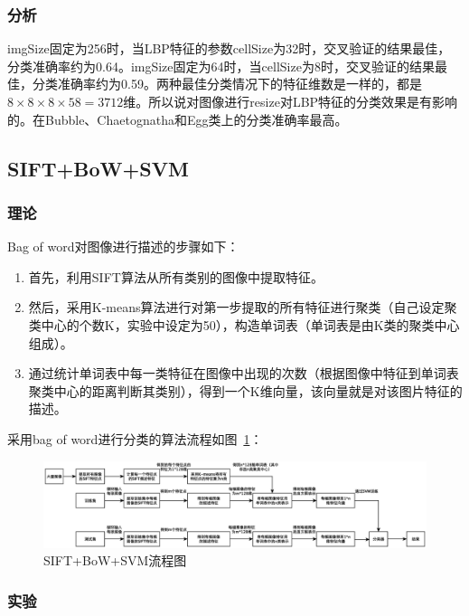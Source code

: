 \documentclass[12pt]{article}
\begin{document}
\subsubsection{分析}

imgSize固定为256时，当LBP特征的参数cellSize为32时，交叉验证的结果最佳，分类准确率约为0.64。imgSize固定为64时，当cellSize为8时，交叉验证的结果最佳，分类准确率约为0.59。两种最佳分类情况下的特征维数是一样的，都是$8\times 8 \times 8\times 58=3712$维。所以说对图像进行resize对LBP特征的分类效果是有影响的。在Bubble、Chaetognatha和Egg类上的分类准确率最高。

\subsection{SIFT+BoW+SVM}

\subsubsection{理论}
Bag of word对图像进行描述的步骤如下：
\begin{enumerate}
\item 首先，利用SIFT算法从所有类别的图像中提取特征。
\item 然后，采用K-means算法进行对第一步提取的所有特征进行聚类（自己设定聚类中心的个数K，实验中设定为50），构造单词表（单词表是由K类的聚类中心组成）。
\item 通过统计单词表中每一类特征在图像中出现的次数（根据图像中特征到单词表聚类中心的距离判断其类别），得到一个K维向量，该向量就是对该图片特征的描述。
\end{enumerate}

采用bag of word进行分类的算法流程如图~\ref{fig:bow}：
\begin{figure}[!ht]
\centering
\includegraphics[width=1.0\linewidth]{bowChina}
\caption{SIFT+BoW+SVM流程图}
\label{fig:bow}
\end{figure}

\subsubsection{实验}
\end{document}
